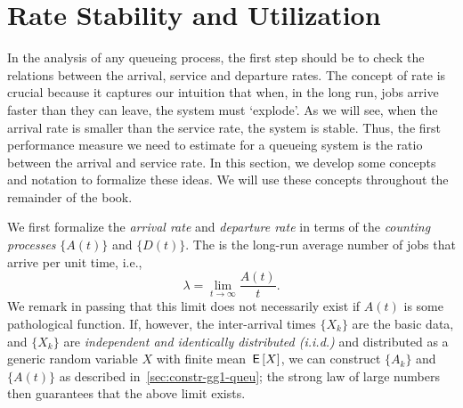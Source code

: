 \section{Rate Stability and Utilization}
\label{sec:rate-stability}



In the analysis of any queueing process, the first step should be to check the relations between the arrival, service and departure rates.
The concept of rate is crucial because it captures our intuition that when, in the long run, jobs arrive faster than they can leave, the system must `explode'.
As we will see, when the arrival rate is smaller than the service rate, the system is stable.
Thus, the first performance measure we need to estimate for a queueing system is the ratio between the arrival and service rate.
In this section, we develop some concepts and notation to formalize these ideas.
We will use these concepts throughout the remainder of the book.

We first formalize the \emph{arrival rate} and \emph{departure rate} in terms of the \emph{counting processes} $\{A(t)\}$ and $\{D(t)\}$.
The  is the long-run average number of jobs that arrive per unit time, i.e.,
\begin{equation}
 \label{eq:3}
 \lambda = \lim_{t\to\infty} \frac{A(t)}t.
\end{equation}
We remark in passing that this limit does not necessarily exist if $A(t)$ is some pathological function.
If, however, the inter-arrival times $\{X_k\}$ are the basic data, and $\{X_k\}$ are \emph{independent and identically distributed (i.i.d.)}
and distributed as a generic random variable $X$ with finite mean $\,\mathsf{E}\left[X\right]$, we can construct $\{A_k\}$ and $\{A(t)\}$ as described in~\cref{sec:constr-gg1-queu}; the strong law of large numbers then guarantees that the above limit exists.


